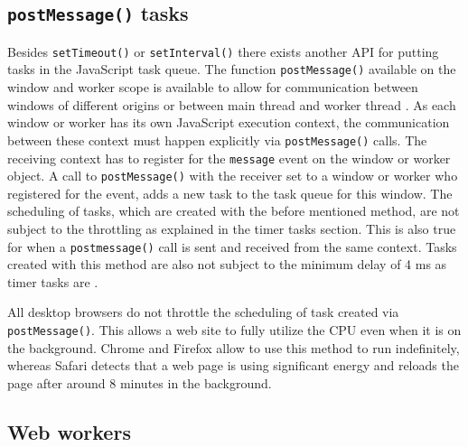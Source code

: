 \documentclass[
	ruledheaders=section,%
	class=report,%
	thesis={type=bachelor},%
	accentcolor=9c,%
	custommargins=true,%
	marginpar=false,%
	parskip=half-,%
	fontsize=11pt,%
]{tudapub}
\begin{document}
  \subsection{\texttt{postMessage()} tasks}

  Besides \texttt{setTimeout()} or \texttt{setInterval()} there exists another API for putting tasks in the JavaScript task queue. The function \texttt{postMessage()} available on the window and worker scope is available to allow for communication between windows of different origins or between main thread and worker thread \cite{mdn-postmessage}. As each window or worker has its own JavaScript execution context, the communication between these context must happen explicitly via \texttt{postMessage()} calls. The receiving context has to register for the \texttt{message} event on the window or worker object. A call to \texttt{postMessage()} with the receiver set to a window or worker who registered for the event, adds a new task to the task queue for this window. The scheduling of tasks, which are created with the before mentioned method, are not subject to the throttling as explained in the timer tasks section. This is also true for when a \texttt{postmessage()} call is sent and received from the same context. Tasks created with this method are also not subject to the minimum delay of 4 ms as timer tasks are \cite{zero-delay-timeouts}.

  All desktop browsers do not throttle the scheduling of task created via \texttt{postMessage()}. This allows a web site to fully utilize the CPU even when it is on the background. Chrome and Firefox allow to use this method to run indefinitely, whereas Safari detects that a web page is using significant energy and reloads the page after around 8 minutes in the background.

  
  \subsection{Web workers}
\end{document}
